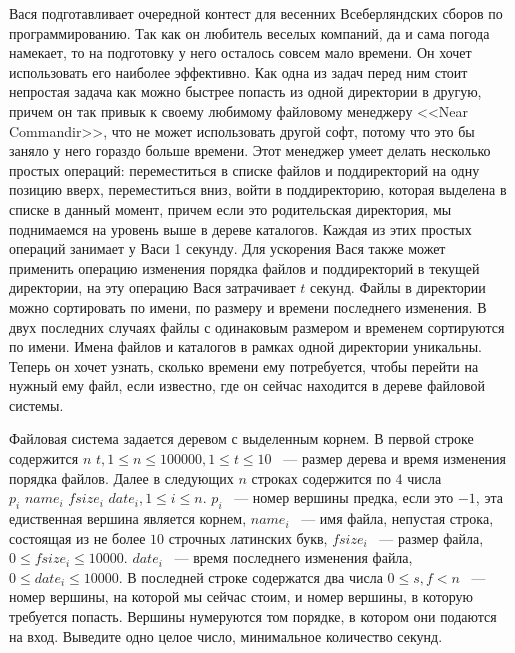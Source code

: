 Вася подготавливает очередной контест для весенних
Всеберляндских сборов по программированию. Так как
он любитель веселых компаний, да и сама погода
намекает, то на подготовку у него осталось совсем мало времени.
Он хочет использовать его наиболее эффективно. Как одна из задач
перед ним стоит непростая задача как можно быстрее попасть
из одной директории в другую, причем он так привык к своему
любимому файловому менеджеру <<Near Commandir>>, что не может
использовать другой софт, потому что это бы заняло у него
гораздо больше времени. Этот менеджер умеет делать
несколько простых операций: переместиться в списке файлов и поддиректорий
на одну позицию вверх, переместиться вниз, войти в поддиректорию,
которая выделена в списке в данный момент, причем если это родительская
директория, мы поднимаемся на уровень выше в дереве каталогов.
Каждая из этих простых операций занимает у Васи 1 секунду.
Для ускорения Вася также может применить операцию изменения порядка файлов
и поддиректорий в текущей директории, на эту операцию Вася затрачивает $t$
секунд. Файлы в директории можно сортировать по имени,
по размеру и времени последнего изменения. В двух последних
случаях файлы с одинаковым размером и временем сортируются по имени.
Имена файлов и каталогов в рамках одной директории уникальны.
Теперь он хочет узнать, сколько времени ему потребуется,
чтобы перейти на нужный ему файл, если известно, где он сейчас
находится в дереве файловой системы.

\InputFile
Файловая система задается деревом с выделенным корнем. В первой строке
содержится $n \,\, t, 1 \le n \le 100000, 1 \le t \le 10$
~--- размер дерева и время изменения порядка файлов. Далее в следующих
$n$ строках содержится по $4$ числа
$p_i \,\, name_i \,\, fsize_i \,\, date_i, 1\le i \le n$.
$p_i$ ~--- номер вершины предка, если это $-1$, эта едиственная вершина
является корнем, $name_i$ ~--- имя файла, непустая строка,
состоящая из не более $10$
строчных латинских букв, $fsize_i$ ~--- размер файла,
$0 \le fsize_i \le 10000$.
$date_i$ ~--- время последнего изменения файла, $0 \le date_i \le 10000$.
В последней строке содержатся два числа $0 \le s, f < n$ ~---
номер вершины, на которой мы сейчас стоим, и номер вершины, в которую
требуется попасть. Вершины нумеруются том порядке,
в котором они подаются на вход.
\OutputFile
Выведите одно целое число, минимальное количество секунд.
